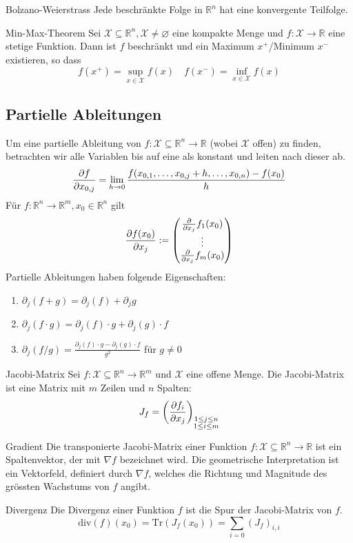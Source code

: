 \documentclass[a4paper,10pt]{article}
\def\R{\mathbb{R}}
\def\X{\mathcal{X}}
\begin{document}
\begin{subbox}{Bolzano-Weierstrass}
  Jede beschränkte Folge in \(\R^n\) hat eine konvergente Teilfolge.
\end{subbox}
\begin{subbox}{Min-Max-Theorem}
  Sei \(\X \subseteq \R^n, \X \ne \varnothing\) eine kompakte Menge und \(f: \X \to \R\) eine stetige Funktion. Dann ist \(f\) beschränkt und ein Maximum \(x^+\)/Minimum \(x^-\)existieren, so dass
  \[f(x^+) = \sup_{x\in \X} f(x) \quad f(x^-) = \inf_{x \in \X} f(x)\]
\end{subbox}
\subsection{Partielle Ableitungen}
Um eine partielle Ableitung von \(f: \X \subseteq \R^n \to \R\) (wobei \(\X\) offen) zu finden, betrachten wir alle Variablen bis auf eine als konstant und leiten nach dieser ab.
\[\pdv{f}{x_{0,j}} = \lim_{h \to 0} \frac{f(x_{0,1}, \ldots, x_{0,j} + h, \ldots, x_{0,n}) - f(x_0)}{h}\]
Für \(f: \R^n \to \R^m, x_0 \in \R^n\) gilt
\begin{align*}
  \pdv{f(x_0)}{x_j} := \begin{pmatrix}
    \pdv*{f_1(x_0)}{x_j}\\
    \vdots\\
    \pdv*{f_m(x_0)}{x_j}\\
  \end{pmatrix}
\end{align*}
Partielle Ableitungen haben folgende Eigenschaften:
\begin{enumerate}
  \item \(\partial_j(f + g) = \partial_j (f) + \partial_j g\)
  \item \(\partial_j(f \cdot g) = \partial_j (f) \cdot g + \partial_j (g) \cdot f\)
  \item \(\partial_j(f / g) = \frac{\partial_j (f) \cdot g - \partial_j (g) \cdot f}{g^2}\) für \(g \ne 0\)
\end{enumerate}
\begin{mainbox}{Jacobi-Matrix}
Sei \(f: \X \subseteq \R^n \to \R^m\) und \(\X\) eine offene Menge. Die Jacobi-Matrix ist eine Matrix mit \(m\) Zeilen und \(n\) Spalten:
\[J_f = \left( \pdv{f_i}{x_j} \right)_{\substack{1 \leq j \leq n \\ 1 \leq i \leq m}}\]
\end{mainbox}
\begin{mainbox}{Gradient}
  Die transponierte Jacobi-Matrix einer Funktion \(f: \X \subseteq \R^n \to \R\) ist ein Spaltenvektor, der mit \(\nabla f\) bezeichnet wird. Die geometrische Interpretation ist ein Vektorfeld, definiert durch \(\nabla f\), welches die Richtung und Magnitude des grössten Wachstums von \(f\) angibt.
\end{mainbox}
\begin{subbox}{Divergenz}
  Die Divergenz einer Funktion \(f\) ist die Spur der Jacobi-Matrix von \(f\). \[\text{div}(f)(x_0) = \text{Tr}(J_f(x_0)) = \sum_{i=0}(J_f)_{i,i}\]
\end{subbox}
\end{document}

